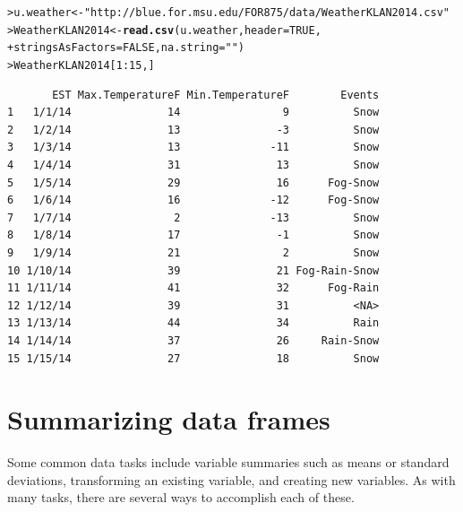\documentclass[12pt,oneside]{book}\usepackage[]{graphicx}\usepackage[]{color}
\makeatletter
\newcommand{\hlnum}[1]{\textcolor[rgb]{0.686,0.059,0.569}{#1}}%
\newcommand{\hlstr}[1]{\textcolor[rgb]{0.192,0.494,0.8}{#1}}%
\newcommand{\hlopt}[1]{\textcolor[rgb]{0,0,0}{#1}}%
\newcommand{\hlstd}[1]{\textcolor[rgb]{0.345,0.345,0.345}{#1}}%
\newcommand{\hlkwb}[1]{\textcolor[rgb]{0.69,0.353,0.396}{#1}}%
\newcommand{\hlkwc}[1]{\textcolor[rgb]{0.333,0.667,0.333}{#1}}%
\newcommand{\hlkwd}[1]{\textcolor[rgb]{0.737,0.353,0.396}{\textbf{#1}}}%
\newenvironment{kframe}{%
 \def\at@end@of@kframe{}%
 \ifinner\ifhmode%
  \def\at@end@of@kframe{\end{minipage}}%
  \begin{minipage}{\columnwidth}%
 \fi\fi%
 \def\FrameCommand##1{\hskip\@totalleftmargin \hskip-\fboxsep
 \colorbox{shadecolor}{##1}\hskip-\fboxsep
     \hskip-\linewidth \hskip-\@totalleftmargin \hskip\columnwidth}%
 \MakeFramed {\advance\hsize-\width
   \@totalleftmargin\z@ \linewidth\hsize
   \@setminipage}}%
 {\par\unskip\endMakeFramed%
 \at@end@of@kframe}
\newenvironment{knitrout}{}{} %
\makeatother
\begin{document}
\begin{knitrout}
\color{fgcolor}\begin{kframe}
\begin{alltt}
\hlstd{> }\hlstd{u.weather} \hlkwb{<-} \hlstr{"http://blue.for.msu.edu/FOR875/data/WeatherKLAN2014.csv"}
\hlstd{> }\hlstd{WeatherKLAN2014} \hlkwb{<-} \hlkwd{read.csv}\hlstd{(u.weather,} \hlkwc{header}\hlstd{=}\hlnum{TRUE}\hlstd{,}
\hlstd{+ }                            \hlkwc{stringsAsFactors} \hlstd{=} \hlnum{FALSE}\hlstd{,} \hlkwc{na.string} \hlstd{=} \hlstr{""}\hlstd{)}
\hlstd{> }\hlstd{WeatherKLAN2014[}\hlnum{1}\hlopt{:}\hlnum{15}\hlstd{,]}
\end{alltt}
\begin{verbatim}
       EST Max.TemperatureF Min.TemperatureF        Events
1   1/1/14               14                9          Snow
2   1/2/14               13               -3          Snow
3   1/3/14               13              -11          Snow
4   1/4/14               31               13          Snow
5   1/5/14               29               16      Fog-Snow
6   1/6/14               16              -12      Fog-Snow
7   1/7/14                2              -13          Snow
8   1/8/14               17               -1          Snow
9   1/9/14               21                2          Snow
10 1/10/14               39               21 Fog-Rain-Snow
11 1/11/14               41               32      Fog-Rain
12 1/12/14               39               31          <NA>
13 1/13/14               44               34          Rain
14 1/14/14               37               26     Rain-Snow
15 1/15/14               27               18          Snow
\end{verbatim}
\end{kframe}
\end{knitrout}

\section{Summarizing data frames}
Some common data tasks include variable summaries such as means or standard deviations, transforming an existing variable, and creating new variables. As with many tasks, there are several ways to accomplish each of these.
\end{document}

